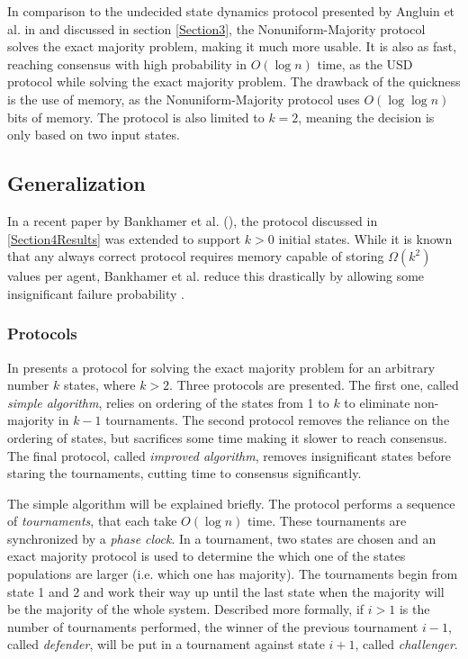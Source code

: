 In comparison to the undecided state dynamics protocol presented by Angluin et al. in \cite{angluinSimplePopulationProtocol2008} and discussed in section \ref{Section3}, the Nonuniform-Majority protocol solves the exact majority problem, making it much more usable. It is also as fast, reaching consensus with high probability in $O(\log n)$ time, as the USD protocol while solving the exact majority problem. The drawback of the quickness is the use of memory, as the Nonuniform-Majority protocol uses $O(\log \log n)$ bits of memory.  The protocol is also limited to $k = 2$, meaning the decision is only based on two input states. 

\subsection{Generalization}

In a recent paper by Bankhamer et al. (\cite{bankhamerPopulationProtocolsExact2022}), the protocol discussed in \ref{Section4Results} was extended to support $k > 0$ initial states. While it is known that any always correct protocol requires memory capable of storing $\Omega(k^2)$ values per agent, Bankhamer et al. reduce this drastically by allowing some insignificant failure probability \cite{ongaroSearchUnderstandableConsensus}. 

\subsubsection{Protocols}

In \cite{bankhamerPopulationProtocolsExact2022} presents a protocol for solving the exact majority problem for an arbitrary number $k$ states, where $k > 2$. Three protocols are presented. The first one, called \emph{simple algorithm}, relies on ordering of the states from 1 to $k$ to eliminate non-majority in $k-1$ tournaments. The second protocol removes the reliance on the ordering of states, but sacrifices some time making it slower to reach consensus. The final protocol, called \emph{improved algorithm}, removes insignificant states before staring the tournaments, cutting time to consensus significantly. 

The simple algorithm will be explained briefly. The protocol performs a sequence of \emph{tournaments}, that each take $O(\log n)$ time. These tournaments are synchronized by a \emph{phase clock}. In a tournament, two states are chosen and an exact majority protocol is used to determine the which one of the states populations are larger (i.e. which one has majority). The tournaments begin from state 1 and 2 and work their way up until the last state when the majority will be the majority of the whole system. Described more formally, if $i > 1$ is the number of tournaments performed, the winner of the previous tournament $i - 1$, called \emph{defender}, will be put in a tournament against state $i + 1$, called \emph{challenger}. 

